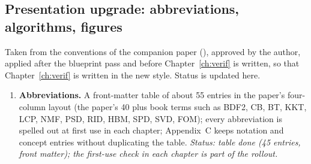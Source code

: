 \subsection{Presentation upgrade: abbreviations, algorithms, figures}\label{sec:presentation}
Taken from the conventions of the companion paper (), approved by the author, applied after the blueprint pass and before Chapter~\ref{ch:verif} is written, so that Chapter~\ref{ch:verif} is written in the new style. Status is updated here.
\begin{enumerate}
\item \textbf{Abbreviations.} A front-matter table of about 55 entries in the paper's four-column layout (the paper's 40 plus book terms such as BDF2, CB, BT, KKT, LCP, NMF, PSD, RID, HBM, SPD, SVD, FOM); every abbreviation is spelled out at first use in each chapter; Appendix~C keeps notation and concept entries without duplicating the table. \emph{Status: table done (45 entries, front matter); the first-use check in each chapter is part of the rollout.}

\end{enumerate}

